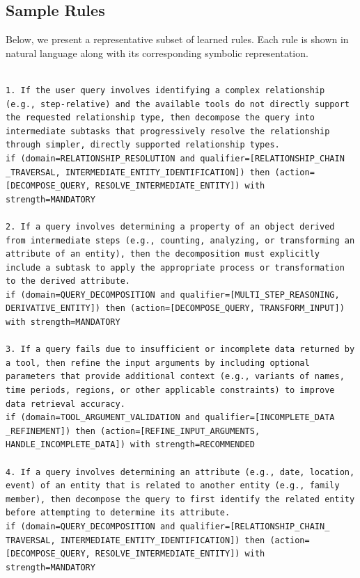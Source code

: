 \documentclass[11pt]{article}
\begin{document}

\subsection{Sample Rules}
\label{app:sample_rules}

Below, we present a representative subset of learned rules. Each rule is shown in natural language along with its corresponding symbolic representation.

\lstset{inputencoding=utf8}


\begin{lstlisting}[style=rulestyle, caption={Sample rules learned from the ToolHop dataset}]

1. If the user query involves identifying a complex relationship (e.g., step-relative) and the available tools do not directly support the requested relationship type, then decompose the query into intermediate subtasks that progressively resolve the relationship through simpler, directly supported relationship types.
if (domain=RELATIONSHIP_RESOLUTION and qualifier=[RELATIONSHIP_CHAIN
_TRAVERSAL, INTERMEDIATE_ENTITY_IDENTIFICATION]) then (action=[DECOMPOSE_QUERY, RESOLVE_INTERMEDIATE_ENTITY]) with strength=MANDATORY

2. If a query involves determining a property of an object derived from intermediate steps (e.g., counting, analyzing, or transforming an attribute of an entity), then the decomposition must explicitly include a subtask to apply the appropriate process or transformation to the derived attribute.
if (domain=QUERY_DECOMPOSITION and qualifier=[MULTI_STEP_REASONING, DERIVATIVE_ENTITY]) then (action=[DECOMPOSE_QUERY, TRANSFORM_INPUT]) with strength=MANDATORY

3. If a query fails due to insufficient or incomplete data returned by a tool, then refine the input arguments by including optional parameters that provide additional context (e.g., variants of names, time periods, regions, or other applicable constraints) to improve data retrieval accuracy.
if (domain=TOOL_ARGUMENT_VALIDATION and qualifier=[INCOMPLETE_DATA
_REFINEMENT]) then (action=[REFINE_INPUT_ARGUMENTS, HANDLE_INCOMPLETE_DATA]) with strength=RECOMMENDED

4. If a query involves determining an attribute (e.g., date, location, event) of an entity that is related to another entity (e.g., family member), then decompose the query to first identify the related entity before attempting to determine its attribute.
if (domain=QUERY_DECOMPOSITION and qualifier=[RELATIONSHIP_CHAIN_
TRAVERSAL, INTERMEDIATE_ENTITY_IDENTIFICATION]) then (action=[DECOMPOSE_QUERY, RESOLVE_INTERMEDIATE_ENTITY]) with strength=MANDATORY


\end{lstlisting}
\end{document}

